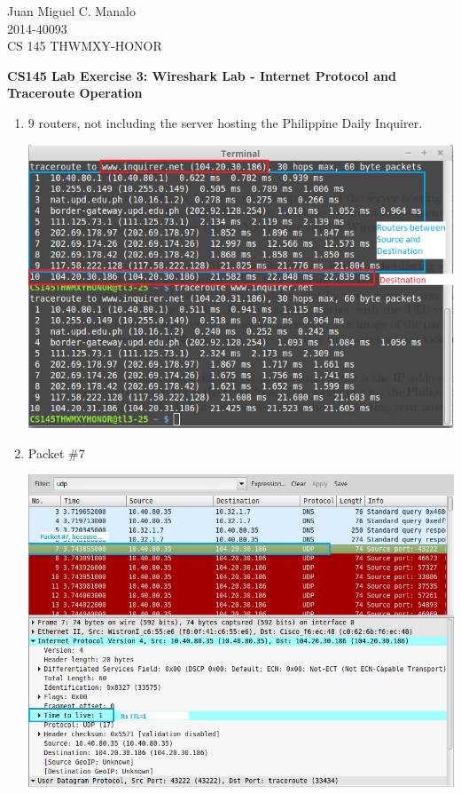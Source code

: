 \documentclass[11pt]{article}
\begin{document}
\begin{flushleft}
Juan Miguel C. Manalo \\
2014-40093 \\
CS 145 THWMXY-HONOR
\end{flushleft}

\begin{center}
\textbf{CS145 Lab Exercise 3: Wireshark Lab - Internet Protocol and Traceroute Operation}
\end{center}

\begin{enumerate}
\item
9 routers, not including the server hosting the Philippine Daily Inquirer.
\begin{center}
\includegraphics[scale=0.5]{Q1}
\end{center}

\item
Packet \#7
\begin{center}
\includegraphics[scale=0.4]{Q2}
\end{center}


\end{enumerate}
\end{document}
